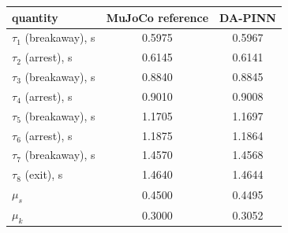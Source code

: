 \begin{tabular}{lcc}\hline
quantity & MuJoCo reference & DA-PINN \\
\hline
$\tau_{1}$ (breakaway), s & 0.5975 & 0.5967 \\
$\tau_{2}$ (arrest), s & 0.6145 & 0.6141 \\
$\tau_{3}$ (breakaway), s & 0.8840 & 0.8845 \\
$\tau_{4}$ (arrest), s & 0.9010 & 0.9008 \\
$\tau_{5}$ (breakaway), s & 1.1705 & 1.1697 \\
$\tau_{6}$ (arrest), s & 1.1875 & 1.1864 \\
$\tau_{7}$ (breakaway), s & 1.4570 & 1.4568 \\
$\tau_{8}$ (exit), s & 1.4640 & 1.4644 \\
$\mu_s$ & 0.4500 & 0.4495 \\
$\mu_k$ & 0.3000 & 0.3052 \\
\hline\end{tabular}
